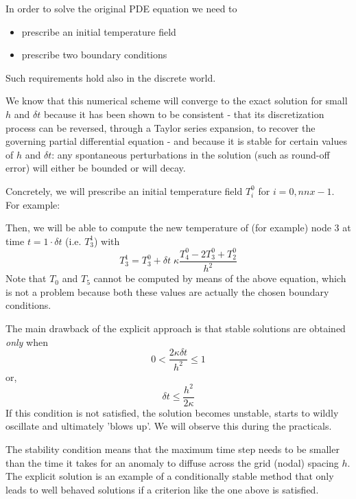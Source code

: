 \begin{center}

\end{center}


In order to solve the original PDE equation we need to
\begin{itemize}
\item prescribe an initial temperature field
\item prescribe two boundary conditions 
\end{itemize}
Such requirements hold also in the discrete world. 

We know that this numerical scheme will converge to the exact solution for
small $h$ and $\delta t$ because it has been shown to be {\color{olive}consistent} - 
that its discretization process
can be reversed, through a Taylor series expansion, to recover the governing partial differential equation -
and because it is {\color{olive}stable} for certain values of
$h$ and $\delta t$: any spontaneous perturbations in the solution (such as round-off error) 
will either be bounded or will decay.

Concretely, we will prescribe an initial temperature field $T_i^0$ for $i=0,nnx-1$.
For example:

\begin{center}

\end{center}

Then, we will be able to compute the new temperature of (for example) 
node 3 at time $t=1\cdot \delta t$ 
(i.e. $T_3^1$) with 
\[
T_3^{1}=T_3^0 + \delta t \; \kappa \frac{T_{4}^0 - 2T_3^0 + T_{2}^0}{h^2}
\]
Note that $T_0$ and $T_5$ cannot be computed by means of the above equation, 
which is not a problem because both these values are actually the chosen 
boundary conditions. 


The main drawback of the explicit approach is that stable solutions are
obtained {\it only} when
\[
0 < \frac{2\kappa \delta t}{h^2} \leq1
\]
or,
\[
\delta t \leq \frac{h^2}{2 \kappa}
\]
If this condition is not satisfied, the solution becomes {\color{olive} unstable}, starts to
wildly oscillate and ultimately 'blows up'. We will observe this during the practicals. 

The stability condition means that the maximum time step needs to be smaller than the time it
takes for an anomaly to diffuse across the grid (nodal) spacing $h$.
The explicit solution is an example of a {\color{olive} conditionally stable method}
that only leads to well behaved solutions if a criterion like the one above is satisfied.

